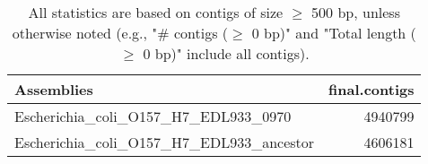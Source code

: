 \documentclass[12pt,a4paper]{article}
\begin{document}
\begin{table}[ht]
\begin{center}
\caption{All statistics are based on contigs of size $\geq$ 500 bp, unless otherwise noted (e.g., "\# contigs ($\geq$ 0 bp)" and "Total length ($\geq$ 0 bp)" include all contigs).}
\begin{tabular}{|l*{1}{|r}|}
\hline
Assemblies & final.contigs \\ \hline
Escherichia\_coli\_O157\_H7\_EDL933\_0970 & 4940799 \\ \hline
Escherichia\_coli\_O157\_H7\_EDL933\_ancestor & 4606181 \\ \hline
\end{tabular}
\end{center}
\end{table}
\end{document}
